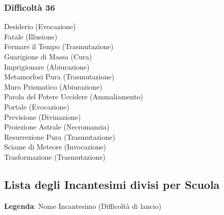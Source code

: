 \begin{multicols}{3}
	\subsubsection{Difficoltà 36}
	Desiderio (Evocazione)\\
	Fatale (Illusione)\\
	Fermare il Tempo (Trasmutazione)\\
	Guarigione di Massa (Cura)\\
	Imprigionare (Abiurazione)\\
	Metamorfosi Pura (Trasmutazione)\\
	Muro Prismatico (Abiurazione)\\
	Parola del Potere Uccidere (Ammaliamento)\\
	Portale (Evocazione)\\
	Previsione (Divinazione)\\
	Proiezione Astrale (Necromanzia)\\
	Resurrezione Pura (Trasmutazione)\\
	Sciame di Meteore (Invocazione)\\
	Trasformazione (Trasmutazione)\\
	
	\subsection{Lista degli Incantesimi divisi per Scuola}
	
	\textbf{Legenda}: Nome Incantesimo (Difficoltà di lancio)\\
	

\end{multicols}
